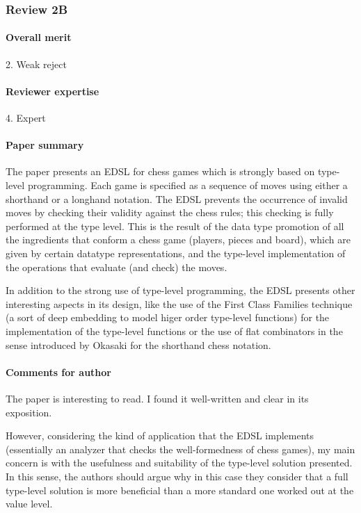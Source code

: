 \subsubsection{Review 2B}

\paragraph{Overall merit}

2. Weak reject

\paragraph{Reviewer expertise}

4. Expert

\paragraph{Paper summary}

The paper presents an EDSL for chess games which is strongly based on type-level programming. Each game is specified as a sequence of moves using either a shorthand or a longhand notation. The EDSL prevents the occurrence of invalid moves by checking their validity against the chess rules; this checking is fully performed at the type level. This is the result of the data type promotion of all the ingredients that conform a chess game (players, pieces and board), which are given by certain datatype representations, and the type-level implementation of the operations that evaluate (and check) the moves.

In addition to the strong use of type-level programming, the EDSL presents other interesting aspects in its design, like the use of the First Class Families technique (a sort of deep embedding to model higer order type-level functions) for the implementation of the type-level functions or the use of flat combinators in the sense introduced by Okasaki for the shorthand chess notation.

\paragraph{Comments for author}

The paper is interesting to read. I found it well-written and clear in its exposition.

However, considering the kind of application that the EDSL implements (essentially an analyzer that checks the well-formedness of chess games), my main concern is with the usefulness and suitability of the type-level solution presented. In this sense, the authors should argue why in this case they consider that a full type-level solution is more beneficial than a more standard one worked out at the value level.

